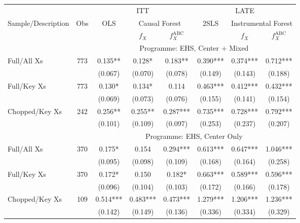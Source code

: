 \begin{tabular}{lccccccc}
\toprule 
\midrule 
\multicolumn{2}{c}{} & \multicolumn{3}{c}{ITT} & \multicolumn{3}{c}{LATE} \\
 \cmidrule(lr){3-5} \cmidrule(lr){6-8} 
Sample/Description & Obs & OLS & \multicolumn{2}{c}{Causal Forest} & 2SLS & \multicolumn{2}{c}{Instrumental Forest} \\
\multicolumn{3}{c}{} & $f_X$ & $f_X^{\text{ABC}}$ &  & $f_X$ & $f_X^{\text{ABC}}$ \\
\midrule 
 &  & \multicolumn{6}{c}{Programme: EHS, Center $+$ Mixed} \\
 \cmidrule(lr){3-8} 
Full/All Xs & 773 & 0.135** & 0.128* & 0.183** & 0.390*** & 0.374*** & 0.712*** \\
 &  & (0.067) & (0.070) & (0.078) & (0.149) & (0.143) & (0.188) \\
Full/Key Xs & 773 & 0.130* & 0.134* & 0.114 & 0.463*** & 0.412*** & 0.432*** \\
 &  & (0.069) & (0.073) & (0.076) & (0.155) & (0.141) & (0.154) \\
Chopped/Key Xs & 242 & 0.256** & 0.255** & 0.287*** & 0.735*** & 0.728*** & 0.792*** \\
 &  & (0.101) & (0.109) & (0.097) & (0.253) & (0.237) & (0.207) \\
\midrule 
 &  & \multicolumn{6}{c}{Programme: EHS, Center Only} \\
 \cmidrule(lr){3-8} 
Full/All Xs & 370 & 0.175* & 0.154 & 0.294*** & 0.613*** & 0.647*** & 1.046*** \\
 &  & (0.095) & (0.098) & (0.109) & (0.168) & (0.164) & (0.258) \\
Full/Key Xs & 370 & 0.172* & 0.150 & 0.182* & 0.663*** & 0.589*** & 0.596*** \\
 &  & (0.096) & (0.104) & (0.103) & (0.172) & (0.166) & (0.178) \\
Chopped/Key Xs & 109 & 0.514*** & 0.483*** & 0.473*** & 1.279*** & 1.206*** & 1.236*** \\
 &  & (0.142) & (0.149) & (0.136) & (0.336) & (0.334) & (0.329) \\
\midrule 
\bottomrule 
\end{tabular}
